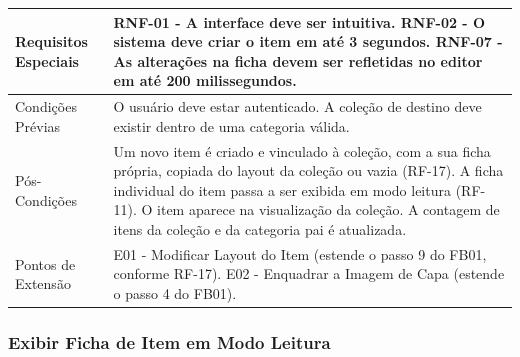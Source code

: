\begin{longtable}{ >{\raggedright}p{2.8cm} | >{\raggedright\arraybackslash}p{10.7cm} }
Requisitos Especiais & RNF-01 - A interface deve ser intuitiva. RNF-02 - O sistema deve criar o item em até 3 segundos. RNF-07 - As alterações na ficha devem ser refletidas no editor em até 200 milissegundos. \\ \hline

Condições Prévias & O usuário deve estar autenticado. A coleção de destino deve existir dentro de uma categoria válida. \\ \hline

Pós-Condições & Um novo item é criado e vinculado à coleção, com a sua ficha própria, copiada do layout da coleção ou vazia (RF-17). A ficha individual do item passa a ser exibida em modo leitura (RF-11). O item aparece na visualização da coleção. A contagem de itens da coleção e da categoria pai é atualizada. \\ \hline

Pontos de Extensão & E01 - Modificar Layout do Item (estende o passo 9 do FB01, conforme RF-17). E02 - Enquadrar a Imagem de Capa (estende o passo 4 do FB01). \\
\end{longtable}
\renewcommand{\arraystretch}{1}
\FloatBarrier


\subsubsection{Exibir Ficha de Item em Modo Leitura}

